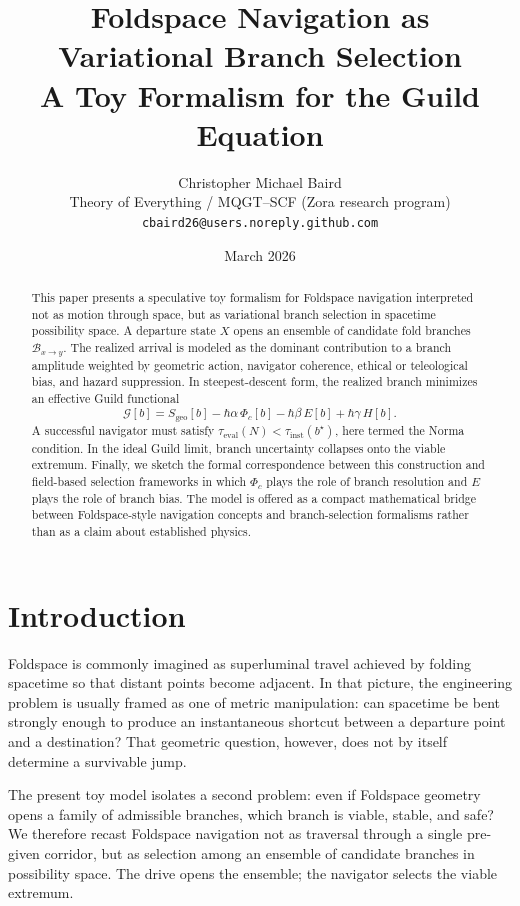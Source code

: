 \documentclass[11pt]{article}
\title{Foldspace Navigation as Variational Branch Selection\\
\large A Toy Formalism for the Guild Equation}
\author{Christopher Michael Baird\\
\normalsize Theory of Everything / MQGT--SCF (Zora research program)\\
\normalsize \texttt{cbaird26@users.noreply.github.com}}
\date{March 2026}
\begin{document}
\maketitle

\begin{abstract}
This paper presents a speculative toy formalism for Foldspace navigation interpreted not as motion through space, but as variational branch selection in spacetime possibility space. A departure state $X$ opens an ensemble of candidate fold branches $\mathcal{B}_{x \rightarrow y}$. The realized arrival is modeled as the dominant contribution to a branch amplitude weighted by geometric action, navigator coherence, ethical or teleological bias, and hazard suppression. In steepest-descent form, the realized branch minimizes an effective Guild functional
\[
\mathcal{G}[b] = S_{\mathrm{geo}}[b] - \hbar \alpha \, \Phi_c[b] - \hbar \beta \, E[b] + \hbar \gamma \, H[b].
\]
A successful navigator must satisfy $\tau_{\mathrm{eval}}(N) < \tau_{\mathrm{inst}}(b^{\star})$, here termed the Norma condition. In the ideal Guild limit, branch uncertainty collapses onto the viable extremum. Finally, we sketch the formal correspondence between this construction and field-based selection frameworks in which $\Phi_c$ plays the role of branch resolution and $E$ plays the role of branch bias. The model is offered as a compact mathematical bridge between Foldspace-style navigation concepts and branch-selection formalisms rather than as a claim about established physics.
\end{abstract}

\section{Introduction}
Foldspace is commonly imagined as superluminal travel achieved by folding spacetime so that distant points become adjacent. In that picture, the engineering problem is usually framed as one of metric manipulation: can spacetime be bent strongly enough to produce an instantaneous shortcut between a departure point and a destination? That geometric question, however, does not by itself determine a survivable jump.

The present toy model isolates a second problem: even if Foldspace geometry opens a family of admissible branches, which branch is viable, stable, and safe? We therefore recast Foldspace navigation not as traversal through a single pre-given corridor, but as selection among an ensemble of candidate branches in possibility space. The drive opens the ensemble; the navigator selects the viable extremum.
\end{document}
